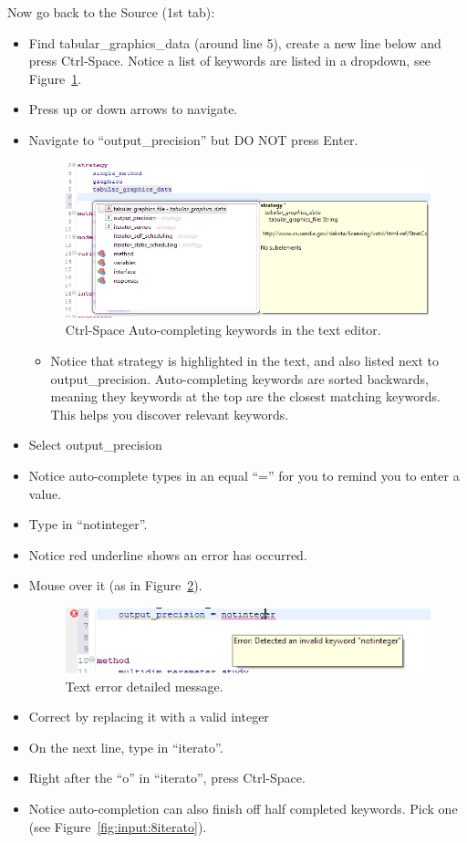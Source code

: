 Now go back to the Source (1st tab):
\begin{itemize}
\item Find tabular\_graphics\_data (around line 5), create a new line below and press Ctrl-Space. Notice a list of keywords are listed in a dropdown, see Figure~\ref{fig:input:6Autocomplete}.
\item Press up or down arrows to navigate.
\item Navigate to ``output\_precision'' but DO NOT press Enter.
\begin{figure}[htbp]
  \centering
  \includegraphics[scale=0.6]{images/6Autocomplete}
  \caption{Ctrl-Space Auto-completing keywords in the text editor.}
  \label{fig:input:6Autocomplete}
\end{figure}
\begin{itemize}
\item Notice that strategy is highlighted in the text, and also listed next to output\_precision. Auto-completing keywords are sorted backwards, meaning they keywords at the top are the closest matching keywords. This helps you discover relevant keywords.
\end{itemize}
\item Select output\_precision
\item Notice auto-complete types in an equal ``='' for you to remind you to enter a value.
\item Type in ``notinteger''.
\item Notice red underline shows an error has occurred.
\item Mouse over it (as in Figure~\ref{fig:input:7texterror}).
\begin{figure}[htbp]
  \centering
  \includegraphics[scale=0.6]{images/7texterror}
  \caption{Text error detailed message.}
  \label{fig:input:7texterror}
\end{figure}
\item Correct by replacing it with a valid integer
\item On the next line, type in ``iterato''.
\item Right after the ``o'' in ``iterato'', press Ctrl-Space.
\item Notice auto-completion can also finish off half completed keywords. Pick one (see Figure~\ref{fig:input:8iterato}).
\end{itemize}
